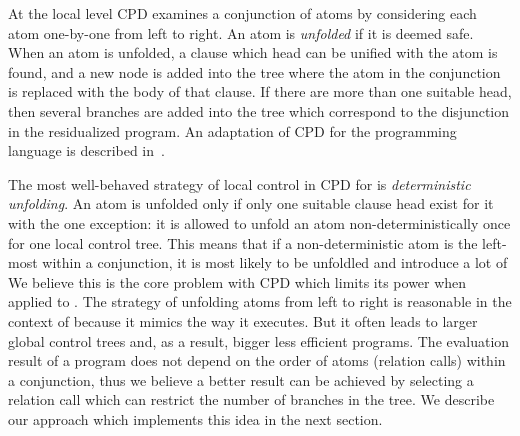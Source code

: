 At the local level CPD examines a conjunction of atoms by considering each atom one-by-one from left to right.
An atom is \emph{unfolded} if it is deemed safe.
When an atom is unfolded, a clause which head can be unified with the atom is found, and a new node is added into the tree where the atom in the conjunction is replaced with the body of that clause.
If there are more than one suitable head, then several branches are added into the tree which correspond to the disjunction in the residualized program.
An adaptation of CPD for the \mk{} programming language is described in~\cite{lozov2019relational}.

The most well-behaved strategy of local control in CPD for \pro{} is \emph{deterministic unfolding}.
An atom is unfolded only if only one suitable clause head exist for it with the one exception: it is allowed to unfold an atom non-deterministically once for one local control tree.
This means that if a non-deterministic atom is the left-most within a conjunction, it is most likely to be unfoldled and introduce a lot of
We believe this is the core problem with CPD which limits its power when applied to \mk{}.
The strategy of unfolding atoms from left to right is reasonable in the context of \pro{} because it mimics the way it executes.
But it often leads to larger global control trees and, as a result, bigger less efficient programs.
The evaluation result of a \mk{} program does not depend on the order of atoms (relation calls) within a conjunction, thus we believe a better result can be achieved by selecting a relation call which can restrict the number of branches in the tree.
We describe our approach which implements this idea in the next section.